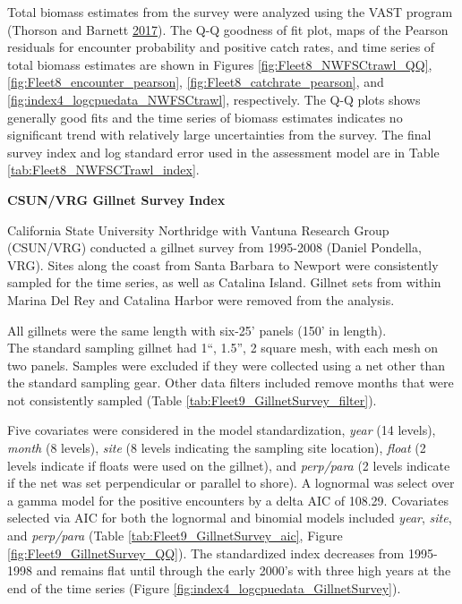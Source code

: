 \documentclass[12pt,]{article}
\begin{document}
Total biomass estimates from the survey were analyzed using the VAST
program (Thorson and Barnett \protect\hyperlink{ref-Thorson2017}{2017}).
The Q-Q goodness of fit plot, maps of the Pearson residuals for
encounter probability and positive catch rates, and time series of total
biomass estimates are shown in Figures \ref{fig:Fleet8_NWFSCtrawl_QQ},
\ref{fig:Fleet8_encounter_pearson}, \ref{fig:Fleet8_catchrate_pearson},
and \ref{fig:index4_logcpuedata_NWFSCtrawl}, respectively. The Q-Q plots
shows generally good fits and the time series of biomass estimates
indicates no significant trend with relatively large uncertainties from
the survey. The final survey index and log standard error used in the
assessment model are in Table \ref{tab:Fleet8_NWFSCTrawl_index}.

\textbf{CSUN/VRG Gillnet Survey Index}

California State University Northridge with Vantuna Research Group
(CSUN/VRG) conducted a gillnet survey from 1995-2008 (Daniel Pondella,
VRG). Sites along the coast from Santa Barbara to Newport were
consistently sampled for the time series, as well as Catalina Island.
Gillnet sets from within Marina Del Rey and Catalina Harbor were removed
from the analysis.

All gillnets were the same length with six-25' panels (150' in
length).\\
The standard sampling gillnet had 1``, 1.5'', 2 square mesh, with each
mesh on two panels. Samples were excluded if they were collected using a
net other than the standard sampling gear. Other data filters included
remove months that were not consistently sampled (Table
\ref{tab:Fleet9_GillnetSurvey_filter}).

Five covariates were considered in the model standardization,
\emph{year} (14 levels), \emph{month} (8 levels), \emph{site} (8 levels
indicating the sampling site location), \emph{float} (2 levels indicate
if floats were used on the gillnet), and \emph{perp/para} (2 levels
indicate if the net was set perpendicular or parallel to shore). A
lognormal was select over a gamma model for the positive encounters by a
delta AIC of 108.29. Covariates selected via AIC for both the lognormal
and binomial models included \emph{year}, \emph{site}, and
\emph{perp/para} (Table \ref{tab:Fleet9_GillnetSurvey_aic}, Figure
\ref{fig:Fleet9_GillnetSurvey_QQ}). The standardized index decreases
from 1995-1998 and remains flat until through the early 2000's with
three high years at the end of the time series (Figure
\ref{fig:index4_logcpuedata_GillnetSurvey}).
\end{document}
